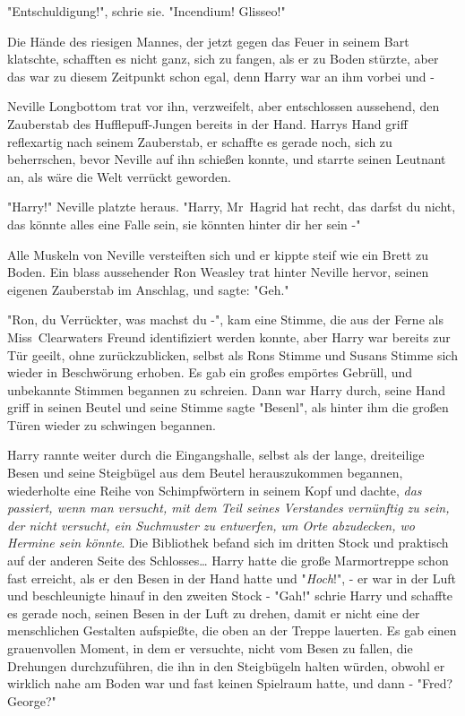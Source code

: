 {"Entschuldigung!", schrie sie. "Incendium! Glisseo!"

Die Hände des riesigen Mannes, der jetzt gegen das Feuer in seinem Bart klatschte, schafften es nicht ganz, sich zu fangen, als er zu Boden stürzte, aber das war zu diesem Zeitpunkt schon egal, denn Harry war an ihm vorbei und -

Neville Longbottom trat vor ihn, verzweifelt, aber entschlossen aussehend, den Zauberstab des Hufflepuff-Jungen bereits in der Hand. Harrys Hand griff reflexartig nach seinem Zauberstab, er schaffte es gerade noch, sich zu beherrschen, bevor Neville auf ihn schießen konnte, und starrte seinen Leutnant an, als wäre die Welt verrückt geworden.

"Harry!" Neville platzte heraus. "Harry, Mr~Hagrid hat recht, das darfst du nicht, das könnte alles eine Falle sein, sie könnten hinter dir her sein -"

Alle Muskeln von Neville versteiften sich und er kippte steif wie ein Brett zu Boden. Ein blass aussehender Ron Weasley trat hinter Neville hervor, seinen eigenen Zauberstab im Anschlag, und sagte: "Geh."

"Ron, du Verrückter, was machst du -", kam eine Stimme, die aus der Ferne als Miss~Clearwaters Freund identifiziert werden konnte, aber Harry war bereits zur Tür geeilt, ohne zurückzublicken, selbst als Rons Stimme und Susans Stimme sich wieder in Beschwörung erhoben. Es gab ein großes empörtes Gebrüll, und unbekannte Stimmen begannen zu schreien. Dann war Harry durch, seine Hand griff in seinen Beutel und seine Stimme sagte "Besenl", als hinter ihm die großen Türen wieder zu schwingen begannen.

Harry rannte weiter durch die Eingangshalle, selbst als der lange, dreiteilige Besen und seine Steigbügel aus dem Beutel herauszukommen begannen, wiederholte eine Reihe von Schimpfwörtern in seinem Kopf und dachte, \emph{das passiert, wenn man versucht, mit dem Teil seines Verstandes vernünftig zu sein, der nicht versucht, ein Suchmuster zu entwerfen, um Orte abzudecken, wo Hermine sein könnte}. Die Bibliothek befand sich im dritten Stock und praktisch auf der anderen Seite des Schlosses… Harry hatte die große Marmortreppe schon fast erreicht, als er den Besen in der Hand hatte und "\emph{Hoch}!", - er war in der Luft und beschleunigte hinauf in den zweiten Stock - "Gah!" schrie Harry und schaffte es gerade noch, seinen Besen in der Luft zu drehen, damit er nicht eine der menschlichen Gestalten aufspießte, die oben an der Treppe lauerten. Es gab einen grauenvollen Moment, in dem er versuchte, nicht vom Besen zu fallen, die Drehungen durchzuführen, die ihn in den Steigbügeln halten würden, obwohl er wirklich nahe am Boden war und fast keinen Spielraum hatte, und dann - "Fred? George?"

}
